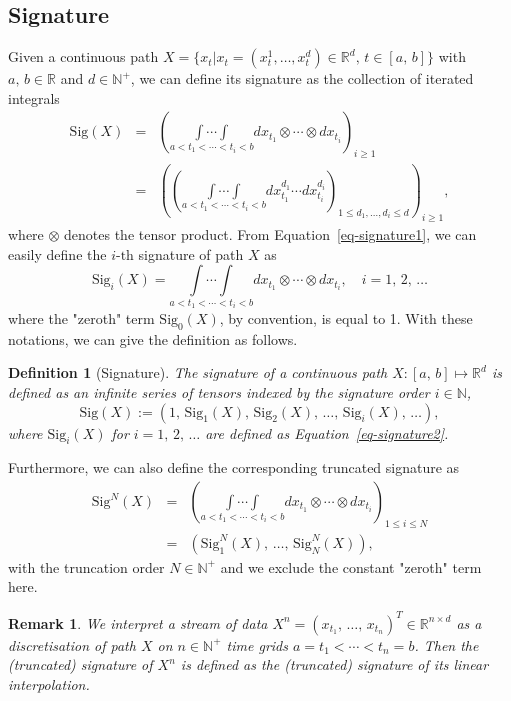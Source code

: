 \documentclass[]{article}
\newtheorem{definition}{\hspace{6mm}Definition}[section]
\newtheorem{remark}{\hspace{6mm}Remark}[section]
\renewcommand{\(}{\left(}
\renewcommand{\)}{\right)}
\begin{document}
	\subsection{Signature}\label{subsec-signature}
	Given a continuous path $X=\{x_t | x_t=(x_t^1,\ldots,x_t^d)\in\mathbb{R}^d,\,t\in[a,\,b]\}$ with $a,\,b\in\mathbb{R}$ and $d\in\mathbb{N}^+$, we can define its signature as the collection of iterated integrals
	\begin{eqnarray}
		\label{eq-signature1}
		\text{Sig}(X)
		&=&\left(\underset{a<t_1<\cdots<t_i<b}{\int\cdots\int}dx_{t_1}\otimes\cdots\otimes dx_{t_i}\right)_{i\geq1} \nonumber\\
		&=&\left(\left(\underset{a<t_1<\cdots<t_i<b}{\int\cdots\int}dx_{t_1}^{d_1}\cdots dx_{t_i}^{d_i}\right)_{1\leq d_1,\ldots, d_i\leq d}\right)_{i\geq1},
	\end{eqnarray}
	where $\otimes$ denotes the tensor product. From Equation~\eqref{eq-signature1}, we can easily define the $i\text{-th}$ signature of path $X$ as
	\begin{equation}
		\label{eq-signature2}
		\text{Sig}_i(X) = \underset{a<t_1<\cdots<t_i<b}{\int\cdots\int}dx_{t_1}\otimes\cdots\otimes dx_{t_i},\quad i=1,\,2,\,\ldots
	\end{equation}
	where the "zeroth" term $\text{Sig}_0(X)$, by convention, is equal to 1. With these notations, we can give the definition as follows.
	\begin{definition}[Signature]
		\label{def-signature}
		The signature of a continuous path $X:[a,\,b]\mapsto\mathbb{R}^d$ is defined as an infinite series of tensors indexed by the signature order $i\in\mathbb{N}$,
		$$\text{Sig}(X):=\left(1,\,\text{Sig}_1(X),\,\text{Sig}_2(X),\,\ldots,\,\text{Sig}_i(X),\,\ldots\right),$$
		where $\text{Sig}_i(X)$ for $i=1,\,2,\,\ldots$ are defined as Equation~\eqref{eq-signature2}.
	\end{definition}
	Furthermore, we can also define the corresponding truncated signature as 
	\begin{eqnarray}
		\label{eq-signature3}
		\text{Sig}^N(X)
		&=&\left(\underset{a<t_1<\cdots<t_i<b}{\int\cdots\int}dx_{t_1}\otimes\cdots\otimes dx_{t_i}\right)_{1\leq i\leq N} \nonumber\\
		&=&\left(\text{Sig}^N_1(X),\,\ldots,\,\text{Sig}^N_N(X)\right),
	\end{eqnarray}
	with the truncation order $N\in\mathbb{N}^+$ and we exclude the constant "zeroth" term here. 
	\begin{remark}
		\label{rmk-stream-signature}
		We interpret a stream of data $X^n={(x_{t_1},\,\ldots,\,x_{t_n})}^T\in\mathbb{R}^{n\times d}$ as a discretisation of path $X$ on $n\in\mathbb{N}^+$ time grids $a=t_1<\cdots<t_n=b$. Then the (truncated) signature of $X^n$ is defined as the (truncated) signature of its linear interpolation.
	\end{remark}
\end{document}
